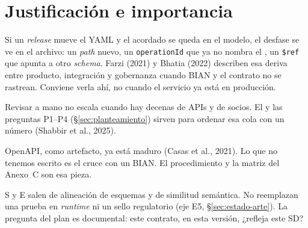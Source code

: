 \section{Justificación e importancia}

Si un \textit{release} mueve el YAML y el \ServiceDomain{} acordado se queda en el modelo, el
desfase se ve en el archivo: un \textit{path} nuevo, un \texttt{operationId} que ya no nombra el
\Behavior{}, un \texttt{\$ref} que apunta a otro \textit{schema}. Farzi (2021) y Bhatia (2022)
describen esa deriva entre producto, integración y gobernanza cuando BIAN y el contrato no se
rastrean. Conviene verla ahí, no cuando el servicio ya está en producción.

Revisar a mano no escala cuando hay decenas de APIs y de socios. El \AlignmentScore{} y las
preguntas P1--P4 (§\ref{sec:planteamiento}) sirven para ordenar esa cola con un número
(Shabbir et al., 2025).

OpenAPI, como artefacto, ya está maduro (Casas et al., 2021). Lo que no tenemos escrito es el
cruce con un \ServiceDomain{} BIAN. El procedimiento y la matriz del Anexo~C son esa pieza.

S y E salen de alineación de esquemas y de similitud semántica. No reemplazan una prueba en
\textit{runtime} ni un sello regulatorio (eje E5, §\ref{sec:estado-arte}). La pregunta del plan es
documental: este contrato, en esta versión, ¿refleja este SD?
